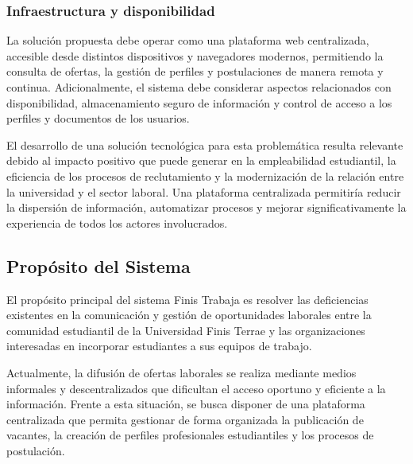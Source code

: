 \documentclass[11pt,a4paper]{Plantilla}
\begin{document}
\vspace{0.3cm}

\subsubsection{Infraestructura y disponibilidad}

La solución propuesta debe operar como una plataforma web centralizada, accesible desde distintos dispositivos y navegadores modernos, permitiendo la consulta de ofertas, la gestión de perfiles y postulaciones de manera remota y continua. Adicionalmente, el sistema debe considerar aspectos relacionados con disponibilidad, almacenamiento seguro de información y control de acceso a los perfiles y documentos de los usuarios.

\vspace{0.3cm}

El desarrollo de una solución tecnológica para esta problemática resulta relevante debido al impacto positivo que puede generar en la empleabilidad estudiantil, la eficiencia de los procesos de reclutamiento y la modernización de la relación entre la universidad y el sector laboral. Una plataforma centralizada permitiría reducir la dispersión de información, automatizar procesos y mejorar significativamente la experiencia de todos los actores involucrados.

\vspace{0.5cm}

\subsection{Propósito del Sistema}%

El propósito principal del sistema Finis Trabaja es resolver las deficiencias existentes en la comunicación y gestión de oportunidades laborales entre la comunidad estudiantil de la Universidad Finis Terrae y las organizaciones interesadas en incorporar estudiantes a sus equipos de trabajo.

\vspace{0.3cm}

Actualmente, la difusión de ofertas laborales se realiza mediante medios informales y descentralizados que dificultan el acceso oportuno y eficiente a la información. Frente a esta situación, se busca disponer de una plataforma centralizada que permita gestionar de forma organizada la publicación de vacantes, la creación de perfiles profesionales estudiantiles y los procesos de postulación.
\end{document}
